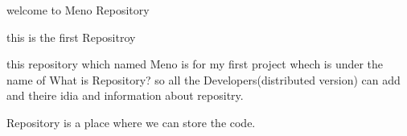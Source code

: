 welcome to Meno Repository

this is the first Repositroy 

this repository which named Meno is for my first project whech is under the name of What is 
Repository? so all the Developers(distributed version) can add and theire idia and information about repositry.

Repository is a place where we can store the code.
